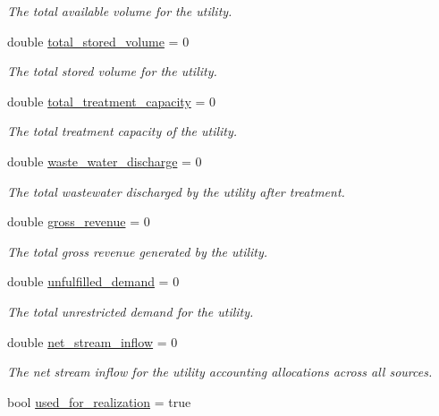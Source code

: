 \begin{DoxyCompactItemize}
\begin{DoxyCompactList}\small\item\em The total available volume for the utility. \end{DoxyCompactList}\item 
double \mbox{\hyperlink{classUtility_af4557d0aba0d4eebbd39ca5fd04ceb30}{total\+\_\+stored\+\_\+volume}} = 0
\begin{DoxyCompactList}\small\item\em The total stored volume for the utility. \end{DoxyCompactList}\item 
double \mbox{\hyperlink{classUtility_a61b0a5f18047ef928506660a48cbbb70}{total\+\_\+treatment\+\_\+capacity}} = 0
\begin{DoxyCompactList}\small\item\em The total treatment capacity of the utility. \end{DoxyCompactList}\item 
double \mbox{\hyperlink{classUtility_a72385ccc48ab17e14105862389a19b7a}{waste\+\_\+water\+\_\+discharge}} = 0
\begin{DoxyCompactList}\small\item\em The total wastewater discharged by the utility after treatment. \end{DoxyCompactList}\item 
double \mbox{\hyperlink{classUtility_ac924f01dbdcc3160c2543b96d8849701}{gross\+\_\+revenue}} = 0
\begin{DoxyCompactList}\small\item\em The total gross revenue generated by the utility. \end{DoxyCompactList}\item 
double \mbox{\hyperlink{classUtility_a42e3f519823e668f9b8affb700e07d86}{unfulfilled\+\_\+demand}} = 0
\begin{DoxyCompactList}\small\item\em The total unrestricted demand for the utility. \end{DoxyCompactList}\item 
double \mbox{\hyperlink{classUtility_add2ce4f2dd3feefe6d9c28ca59f6a0de}{net\+\_\+stream\+\_\+inflow}} = 0
\begin{DoxyCompactList}\small\item\em The net stream inflow for the utility accounting allocations across all sources. \end{DoxyCompactList}\item 
bool \mbox{\hyperlink{classUtility_a4333d1e4444eeaf94acee51a7af35fb0}{used\+\_\+for\+\_\+realization}} = true

\end{DoxyCompactItemize}
